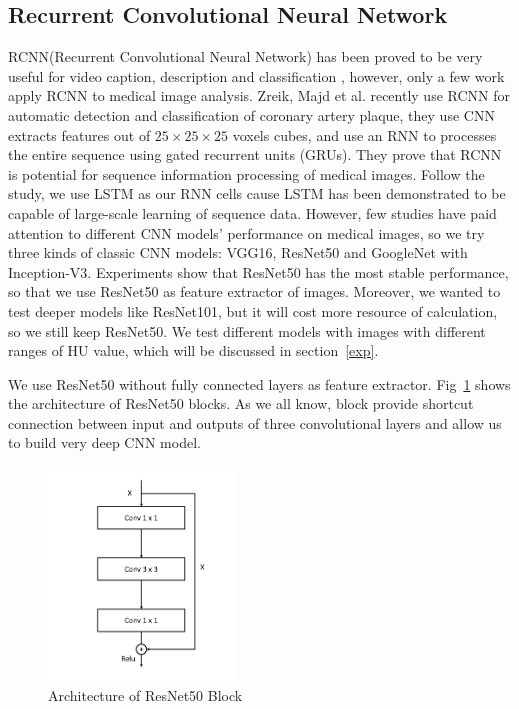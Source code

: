 \documentclass[runningheads]{llncs}
\begin{document}
\subsection{Recurrent Convolutional Neural Network}
\label{RCNN}
RCNN(Recurrent Convolutional Neural Network) has been proved to be very useful for video caption, description and classification \cite{Donahue2015Long}\cite{Aafaq2019Spatio}, however, only a few work apply RCNN to medical image analysis. Zreik, Majd et al. \cite{Zreik2018A} recently use RCNN for automatic detection and classification of coronary artery plaque, they use CNN extracts features out of $ 25\times25\times25$ voxels cubes, and  use an RNN to processes the entire sequence using gated recurrent units (GRUs). They prove that RCNN is potential for sequence information processing of medical images. 
Follow the study\cite{Donahue2015Long}, we use LSTM as our RNN cells cause LSTM has been demonstrated to be capable of large-scale learning of sequence data. However, few studies have paid attention to different CNN models' performance on medical images, so we try three kinds of classic CNN models: VGG16, ResNet50 and GoogleNet with Inception-V3. Experiments show that ResNet50 has the most stable performance, so that we use ResNet50 as feature extractor of images. Moreover, we wanted to test deeper models like ResNet101, but it will cost more resource of calculation, so we still keep ResNet50.
We test different models with images with different ranges of HU value, which will be discussed in section~\ref{exp}.

We use ResNet50 without fully connected layers as feature extractor. Fig~\ref{resnetall} shows the architecture of ResNet50 blocks. As we all know, block provide shortcut connection between input and outputs of three convolutional layers and allow us to build very deep CNN model.

\begin{figure}[htb]
    \caption{Architecture of ResNet50 Block}
    \centerline{\includegraphics[width=50mm]{resnet.pdf}}
    \vspace{-0cm}
    \vspace{-0cm}
    \label{resnetall}
    \end{figure}
\end{document}

